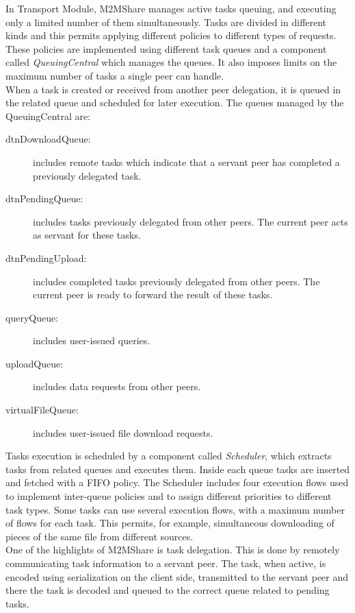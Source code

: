 In Transport Module, M2MShare manages active tasks queuing, and executing only a limited number of them simultaneously. Tasks are divided in different kinds and this permits applying different policies to different types of requests. These policies are implemented using different task queues and a component called \textit{QueuingCentral} which manages the queues. It also imposes limits on the maximum number of tasks a single peer can handle.
\\

When a task is created or received from another peer delegation, it is queued in the related queue and scheduled for later execution. The queues managed by the QueuingCentral are:
\begin{description}
\item[dtnDownloadQueue:] includes remote tasks which indicate that a servant peer has completed a previously delegated task.
\item[dtnPendingQueue:] includes tasks previously delegated from other peers. The current peer acts as servant for these tasks.
\item[dtnPendingUpload:] includes completed tasks previously delegated from other peers. The current peer is ready to forward the result of these tasks.
\item[queryQueue:] includes user-issued queries.
\item[uploadQueue:] includes data requests from other peers.
\item[virtualFileQueue:] includes user-issued file download requests.
\end{description}

Tasks execution is scheduled by a component called \textit{Scheduler}, which extracts tasks from related queues and executes them. Inside each queue tasks are inserted and fetched with a FIFO policy. The Scheduler includes four execution flows used to implement inter-queue policies and to assign different priorities to different task types. Some tasks can use several execution flows, with a maximum number of flows for each task. This permits, for example, simultaneous downloading of pieces of the same file from different sources.
\\

One of the highlights of M2MShare is task delegation. This is done by remotely communicating task information to a servant peer. The task, when active, is encoded using serialization on the client side, transmitted to the servant peer and there the task is decoded and queued to the correct queue related to pending tasks.

